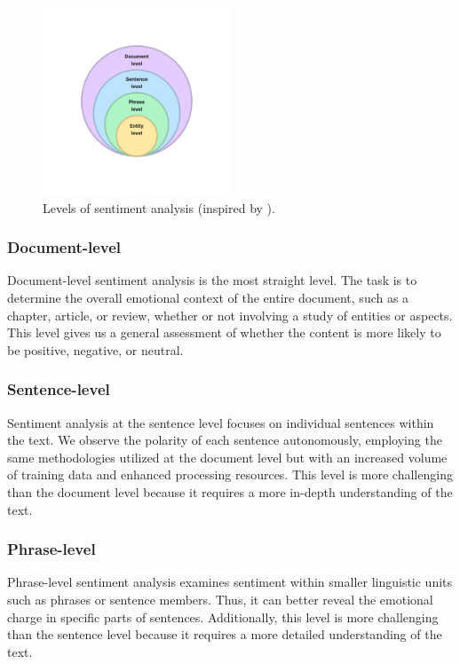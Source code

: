 \begin{figure}[H]
    \centering
    \includegraphics[width=0.5\textwidth]{img/sa-levels.pdf}
    \caption{Levels of sentiment analysis (inspired by \cite{Wankhade2022}).}
    \label{fig:sa-levels}
\end{figure}

\subsubsection*{Document-level}
\label{subsubsec:document-level}
Document-level sentiment analysis is the most straight level. The task is to determine the overall emotional context of the entire document, such as a chapter, article, or review, whether or not involving a study of entities or aspects. This level gives us a general assessment of whether the content is more likely to be positive, negative, or neutral. 

\subsubsection*{Sentence-level}
\label{subsubsec:sentence-level}
Sentiment analysis at the sentence level focuses on individual sentences within the text. We observe the polarity of each sentence autonomously, employing the same methodologies utilized at the document level but with an increased volume of training data and enhanced processing resources. This level is more challenging than the document level because it requires a more in-depth understanding of the text. 

\subsubsection*{Phrase-level}
\label{subsubsec:phrase-level}
Phrase-level sentiment analysis examines sentiment within smaller linguistic units such as phrases or sentence members. Thus, it can better reveal the emotional charge in specific parts of sentences.  Additionally, this level is more challenging than the sentence level because it requires a more detailed understanding of the text. 


